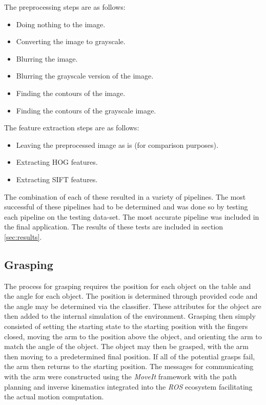 \documentclass[letterpaper, 10 pt, conference]{conf/ieeeconf}  %
\begin{document}
The preprocessing steps are as follows:
\begin{itemize}
\item Doing nothing to the image.
\item Converting the image to grayscale.
\item Blurring the image.
\item Blurring the grayscale version of the image.
\item Finding the contours of the image.
\item Finding the contours of the grayscale image.
\end{itemize}

The feature extraction steps are as follows:
\begin{itemize}
\item Leaving the preprocessed image as is (for comparison purposes).
\item Extracting HOG features.
\item Extracting SIFT features.
\end{itemize}

The combination of each of these resulted in a variety of pipelines. The most
successful of these pipelines had to be determined and was done so by testing
each pipeline on the testing data-set. The most accurate pipeline was included
in the final application. The results of these tests are included in section
\ref{sec:results}.\\

\subsection{Grasping} %
The process for grasping requires the position for each object on the table and
the angle for each object. The position is determined through provided code and
the angle may be determined via the classifier. These attributes for the object
are then added to the internal simulation of the environment. Grasping then
simply consisted of setting the starting state to the starting position with the
fingers closed, moving the arm to the position above the object, and orienting
the arm to match the angle of the object. The object may then be grasped, with
the arm then moving to a predetermined final position. If all of the potential
grasps fail, the arm then returns to the starting position. The messages for
communicating with the arm were constructed using the \textit{MoveIt} framework
with the path planning and inverse kinematics integrated into the \textit{ROS}
ecosystem facilitating the actual motion computation.
\end{document}
